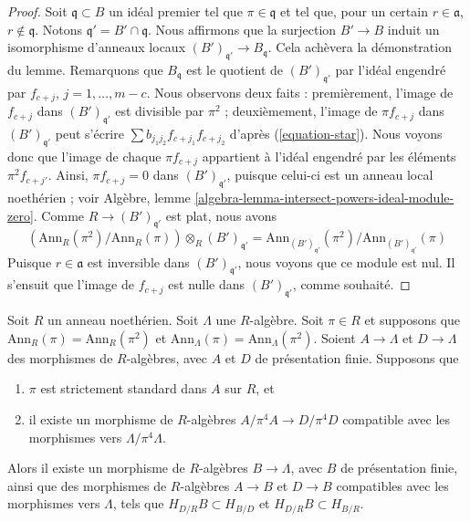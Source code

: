\begin{proof}
\medskip\noindent
Soit $\mathfrak q \subset B$ un idéal premier tel que $\pi \in \mathfrak q$ et
tel que, pour un certain $r \in \mathfrak a$, $r \not \in \mathfrak q$.
Notons $\mathfrak q' = B' \cap \mathfrak q$.
Nous affirmons que la surjection $B' \to B$ induit un isomorphisme d'anneaux
locaux $(B')_{\mathfrak q'} \to B_\mathfrak q$. Cela
achèvera la démonstration du lemme. Remarquons que $B_\mathfrak q$ est le
quotient de $(B')_{\mathfrak q'}$ par l'idéal engendré par
$f_{c + j}$, $j = 1, \ldots, m - c$. Nous observons deux faits :
premièrement, l'image de $f_{c + j}$ dans $(B')_{\mathfrak q'}$ est
divisible par $\pi^2$ ;
deuxièmement, l'image de $\pi f_{c + j}$ dans $(B')_{\mathfrak q'}$
peut s'écrire $\sum b_{j_1 j_2} f_{c + j_1}f_{c + j_2}$ d'après
(\ref{equation-star}). Nous voyons donc que l'image de chaque $\pi f_{c + j}$
appartient à l'idéal engendré par les éléments $\pi^2 f_{c + j'}$.
Ainsi, $\pi f_{c + j} = 0$ dans $(B')_{\mathfrak q'}$, puisque celui-ci est un
anneau local noethérien ; voir
Algèbre, lemme \ref{algebra-lemma-intersect-powers-ideal-module-zero}.
Comme $R \to (B')_{\mathfrak q'}$ est plat, nous avons
$$
\left(\text{Ann}_R(\pi^2)/\text{Ann}_R(\pi)\right)
\otimes_R (B')_{\mathfrak q'}
=
\text{Ann}_{(B')_{\mathfrak q'}}(\pi^2)/\text{Ann}_{(B')_{\mathfrak q'}}(\pi)
$$
Puisque $r \in \mathfrak a$ est inversible dans
$(B')_{\mathfrak q'}$, nous voyons que ce module est nul.
Il s'ensuit que l'image de $f_{c + j}$ est nulle dans
$(B')_{\mathfrak q'}$, comme souhaité.
\end{proof}

\begin{lemma}
\label{lemma-desingularize-strictly-standard}
Soit $R$ un anneau noethérien. Soit $\Lambda$ une $R$-algèbre.
Soit $\pi \in R$ et supposons que $\text{Ann}_R(\pi) = \text{Ann}_R(\pi^2)$ et
$\text{Ann}_\Lambda(\pi) = \text{Ann}_\Lambda(\pi^2)$.
Soient $A \to \Lambda$ et $D \to \Lambda$ des morphismes de $R$-algèbres, avec
$A$ et $D$ de présentation finie. Supposons que
\begin{enumerate}
\item $\pi$ est strictement standard dans $A$ sur $R$, et
\item il existe un morphisme de $R$-algèbres $A/\pi^4 A \to D/\pi^4 D$ compatible
avec les morphismes vers $\Lambda/\pi^4 \Lambda$.
\end{enumerate}
Alors il existe un morphisme de $R$-algèbres $B \to \Lambda$, avec $B$ de
présentation finie, ainsi que des morphismes de $R$-algèbres $A \to B$ et $D \to B$
compatibles avec les morphismes vers $\Lambda$, tels que $H_{D/R}B \subset H_{B/D}$
et $H_{D/R}B \subset H_{B/R}$.
\end{lemma}

